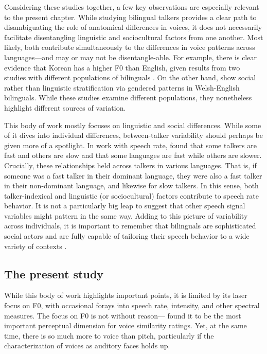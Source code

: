 Considering these studies together, a few key observations are especially relevant to the present chapter. While studying bilingual talkers provides a clear path to disambiguating the role of anatomical differences in voices, it does not necessarily facilitate disentangling linguistic and sociocultural factors from one another. Most likely, both contribute simultaneously to the differences in voice patterns across languages---and may or may not be disentangle-able. For example, there is clear evidence that Korean has a higher F0 than English, given results from two studies with different populations of bilinguals \cite{cheng_2020_f0, lee_2017_bilingual}. On the other hand, \citet{ordin_2017_cross} show social rather than linguistic stratification via gendered patterns in Welsh-English bilinguals. While these studies examine different populations, they nonetheless highlight different sources of variation.

This body of work mostly focuses on linguistic and social differences. While some of it dives into individual differences, between-talker variability should perhaps be given more of a spotlight. In work with speech rate, \citet{bradlow_2017_rate} found that some talkers are fast and others are slow and that some languages are fast while others are slower. Crucially, these relationships held across talkers in various languages. That is, if someone was a fast talker in their dominant language, they were also a fast talker in their non-dominant language, and likewise for slow talkers. In this sense, both talker-indexical and linguistic (or sociocultural) factors contribute to speech rate behavior. It is not a particularly big leap to suggest that other speech signal variables might pattern in the same way. Adding to this picture of variability across individuals, it is important to remember that bilinguals are sophisticated social actors and are fully capable of tailoring their speech behavior to a wide variety of contexts \citep{bullock_2009_sociophonetics}. 

\subsection{The present study}

While this body of work highlights important points, it is limited by its laser focus on F0, with occasional forays into speech rate, intensity, and other spectral measures. The focus on F0 is not without reason---\citet{perrachione_2019_judgments} found it to be the most important perceptual dimension for voice similarity ratings. Yet, at the same time, there is so much more to voice than pitch, particularly if the characterization of voices as auditory faces holds up. 


